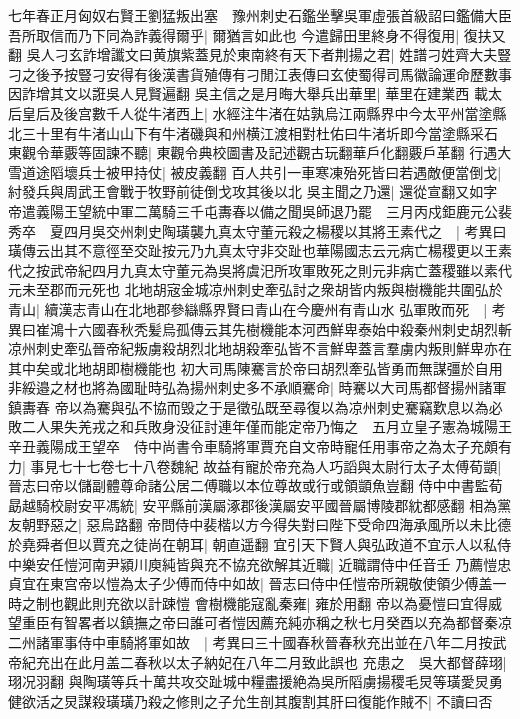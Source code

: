 七年春正月匈奴右賢王劉猛叛出塞　豫州刺史石鑑坐擊吳軍虛張首級詔曰鑑備大臣吾所取信而乃下同為詐義得爾乎|{
	爾猶言如此也}
今遣歸田里終身不得復用|{
	復扶又翻}
吳人刁玄詐增讖文曰黄旗紫蓋見於東南終有天下者荆揚之君|{
	姓譜刁姓齊大夫豎刁之後予按豎刁安得有後漢書貨殖傳有刁閒江表傳曰玄使蜀得司馬徽論運命歷數事因詐增其文以誑吳人見賢遍翻}
吳主信之是月晦大舉兵出華里|{
	華里在建業西}
載太后皇后及後宫數千人從牛渚西上|{
	水經注牛渚在姑孰烏江兩縣界中今太平州當塗縣北三十里有牛渚山山下有牛渚磯與和州横江渡相對杜佑曰牛渚圻即今當塗縣采石}
東觀令華覈等固諫不聽|{
	東觀令典校圖書及記述觀古玩翻華戶化翻覈戶革翻}
行遇大雪道途䧟壞兵士被甲持仗|{
	被皮義翻}
百人共引一車寒凍殆死皆曰若遇敵便當倒戈|{
	紂發兵與周武王會戰于牧野前徒倒戈攻其後以北}
吳主聞之乃還|{
	還從宣翻又如字}
帝遣義陽王望統中軍二萬騎三千屯夀春以備之聞吳師退乃罷　三月丙戍鉅鹿元公裴秀卒　夏四月吳交州刺史陶璜襲九真太守董元殺之楊稷以其將王素代之　|{
	考異曰璜傳云出其不意徑至交趾按元乃九真太守非交趾也華陽國志云元病亡楊稷更以王素代之按武帝紀四月九真太守董元為吳將虞汜所攻軍敗死之則元非病亡蓋稷雖以素代元未至郡而元死也}
北地胡宼金城凉州刺史牽弘討之衆胡皆内叛與樹機能共圍弘於青山|{
	續漢志青山在北地郡參䜌縣界賢曰青山在今慶州有青山水}
弘軍敗而死　|{
	考異曰崔鴻十六國春秋秃髪烏孤傳云其先樹機能本河西鮮卑泰始中殺秦州刺史胡烈斬凉州刺史牽弘晉帝紀叛虜殺胡烈北地胡殺牽弘皆不言鮮卑蓋言羣虜内叛則鮮卑亦在其中矣或北地胡即樹機能也}
初大司馬陳騫言於帝曰胡烈牽弘皆勇而無謀彊於自用非綏邉之材也將為國耻時弘為揚州刺史多不承順騫命|{
	時騫以大司馬都督揚州諸軍鎮夀春}
帝以為騫與弘不協而毁之于是徵弘既至尋復以為凉州刺史騫竊歎息以為必敗二人果失羌戎之和兵敗身没征討連年僅而能定帝乃悔之　五月立皇子憲為城陽王　辛丑義陽成王望卒　侍中尚書令車騎將軍賈充自文帝時寵任用事帝之為太子充頗有力|{
	事見七十七卷七十八卷魏紀}
故益有寵於帝充為人巧謟與太尉行太子太傅荀顗|{
	晉志曰帝以儲副體尊命諸公居二傅職以本位尊故或行或領顗魚豈翻}
侍中中書監荀勗越騎校尉安平馮統|{
	安平縣前漢屬涿郡後漢屬安平國晉屬博陵郡紞都感翻}
相為黨友朝野惡之|{
	惡烏路翻}
帝問侍中裴楷以方今得失對曰陛下受命四海承風所以未比德於堯舜者但以賈充之徒尚在朝耳|{
	朝直遥翻}
宜引天下賢人與弘政道不宜示人以私侍中樂安任愷河南尹潁川庾純皆與充不協充欲解其近職|{
	近職謂侍中任音壬}
乃薦愷忠貞宜在東宫帝以愷為太子少傅而侍中如故|{
	晉志曰侍中任愷帝所親敬使領少傅盖一時之制也觀此則充欲以計踈愷}
會樹機能寇亂秦雍|{
	雍於用翻}
帝以為憂愷曰宜得威望重臣有智畧者以鎮撫之帝曰誰可者愷因薦充純亦稱之秋七月癸酉以充為都督秦凉二州諸軍事侍中車騎將軍如故　|{
	考異曰三十國春秋晉春秋充出並在八年二月按武帝紀充出在此月盖二春秋以太子納妃在八年二月致此誤也}
充患之　吳大都督薛珝|{
	珝况羽翻}
與陶璜等兵十萬共攻交趾城中糧盡援絶為吳所䧟虜揚稷毛炅等璜愛炅勇健欲活之炅謀殺璜璜乃殺之修則之子允生剖其腹割其肝曰復能作賊不|{
	不讀曰否}
